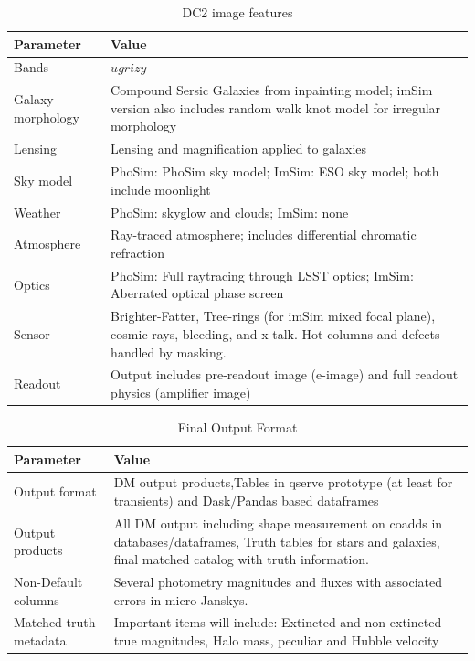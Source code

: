 \documentclass[preprint,times]{aastex61}
\begin{document}
\begin{table}[!htb]
  \centering
  \caption{DC2 image features}
  \label{tab:image-options}
  \begin{tabular}{| L{0.2\textwidth}| L{0.75\textwidth}| }
    \hline 
    Parameter                                      & Value   \\
    \hline
    Bands                                           & $ugrizy$   \\
    Galaxy morphology                      & Compound Sersic Galaxies from inpainting model; imSim version also includes random walk knot model for irregular morphology \\
    Lensing & Lensing and magnification applied to galaxies \\
    Sky model & PhoSim: PhoSim sky model; ImSim: ESO sky model; both include moonlight\\
    Weather & PhoSim: skyglow and clouds; ImSim: none \\
    Atmosphere                           & Ray-traced atmosphere; includes differential chromatic refraction \\
    Optics                                     & PhoSim: Full raytracing through LSST optics; ImSim: Aberrated optical phase screen \\
    Sensor                   &  Brighter-Fatter, Tree-rings (for imSim mixed focal plane), cosmic rays, bleeding, and x-talk.  Hot columns and defects handled by masking. \\
    Readout                                  & Output includes pre-readout image (e-image) and full readout physics (amplifier image)\\
     \hline
  \end{tabular}
\end{table}

\begin{table}[!htb]
  \centering
  \caption{Final Output Format}
  \label{tab:output-options}
  \begin{tabular}{| L{0.2\textwidth}| L{0.75\textwidth}| }
    \hline 
    Parameter                    & Value   \\
        \hline
    Output format             & DM output products,Tables in qserve prototype (at least for transients) and Dask/Pandas based dataframes \\
    Output products         & All DM output including shape measurement on coadds in databases/dataframes, Truth tables for stars and galaxies, final matched catalog with truth information. \\
    Non-Default columns & Several photometry magnitudes and fluxes with associated errors in micro-Janskys. \\
    Matched truth metadata & Important items will include: Extincted and non-extincted true magnitudes, Halo mass, peculiar and Hubble velocity \\
   \hline
  \end{tabular}
\end{table}
\end{document}

